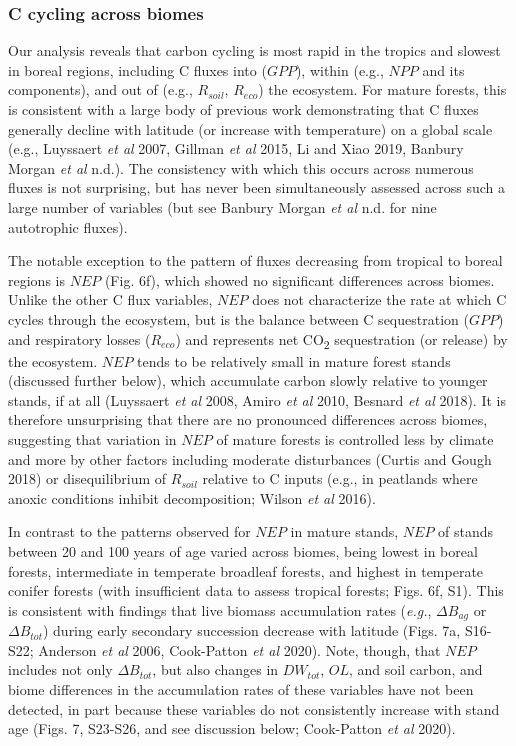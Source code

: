 \documentclass[
]{article}
\begin{document}
\hypertarget{c-cycling-across-biomes}{%
\subsubsection{C cycling across biomes}\label{c-cycling-across-biomes}}

Our analysis reveals that carbon cycling is most rapid in the tropics
and slowest in boreal regions, including C fluxes into (\(GPP\)), within
(e.g., \(NPP\) and its components), and out of (e.g., \(R_{soil}\),
\(R_{eco}\)) the ecosystem. For mature forests, this is consistent with
a large body of previous work demonstrating that C fluxes generally
decline with latitude (or increase with temperature) on a global scale
(e.g., Luyssaert \emph{et al} 2007, Gillman \emph{et al} 2015, Li and
Xiao 2019, Banbury Morgan \emph{et al} n.d.). The consistency with which
this occurs across numerous fluxes is not surprising, but has never been
simultaneously assessed across such a large number of variables (but see
Banbury Morgan \emph{et al} n.d. for nine autotrophic fluxes).

The notable exception to the pattern of fluxes decreasing from tropical
to boreal regions is \(NEP\) (Fig. 6f), which showed no significant
differences across biomes. Unlike the other C flux variables, \(NEP\)
does not characterize the rate at which C cycles through the ecosystem,
but is the balance between C sequestration (\(GPP\)) and respiratory
losses (\(R_{eco}\)) and represents net CO\textsubscript{2}
sequestration (or release) by the ecosystem. \(NEP\) tends to be
relatively small in mature forest stands (discussed further below),
which accumulate carbon slowly relative to younger stands, if at all
(Luyssaert \emph{et al} 2008, Amiro \emph{et al} 2010, Besnard \emph{et
al} 2018). It is therefore unsurprising that there are no pronounced
differences across biomes, suggesting that variation in \(NEP\) of
mature forests is controlled less by climate and more by other factors
including moderate disturbances (Curtis and Gough 2018) or
disequilibrium of \(R_{soil}\) relative to C inputs (e.g., in peatlands
where anoxic conditions inhibit decomposition; Wilson \emph{et al}
2016).

In contrast to the patterns observed for \(NEP\) in mature stands,
\(NEP\) of stands between 20 and 100 years of age varied across biomes,
being lowest in boreal forests, intermediate in temperate broadleaf
forests, and highest in temperate conifer forests (with insufficient
data to assess tropical forests; Figs. 6f, S1). This is consistent with
findings that live biomass accumulation rates (\emph{e.g.},
\(\Delta B_{ag}\) or \(\Delta B_{tot}\)) during early secondary
succession decrease with latitude (Figs. 7a, S16-S22; Anderson \emph{et
al} 2006, Cook-Patton \emph{et al} 2020). Note, though, that \(NEP\)
includes not only \(\Delta B_{tot}\), but also changes in \(DW_{tot}\),
\(OL\), and soil carbon, and biome differences in the accumulation rates
of these variables have not been detected, in part because these
variables do not consistently increase with stand age (Figs. 7, S23-S26,
and see discussion below; Cook-Patton \emph{et al} 2020).
\end{document}
